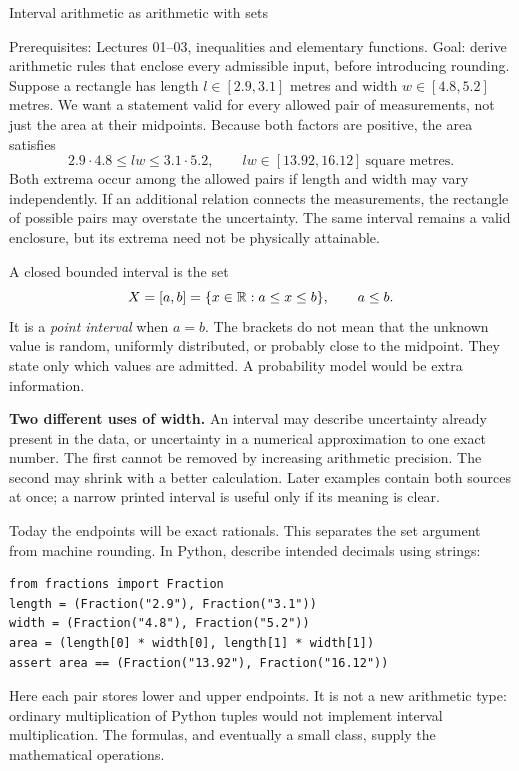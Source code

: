 \def\lecturenumber{04}


\opening{Interval arithmetic as arithmetic with sets}{Prerequisites: Lectures 01--03, inequalities and elementary functions.\newline
Goal: derive arithmetic rules that enclose every admissible input, before introducing rounding.}
Suppose a rectangle has length $l\in[2.9,3.1]$ metres and width
$w\in[4.8,5.2]$ metres. We want a statement valid for every allowed pair of
measurements, not just the area at their midpoints. Because both factors are
positive, the area satisfies
\[
 2.9\cdot4.8\le lw\le3.1\cdot5.2,
 \qquad lw\in[13.92,16.12]\ \text{square metres}.
\]
Both extrema occur among the allowed pairs if length and width may vary
independently. If an additional relation connects the measurements, the rectangle
of possible pairs may overstate the uncertainty. The same interval remains a
valid enclosure, but its extrema need not be physically attainable.

A closed bounded interval is the set
\[
 X=[a,b]=\{x\in\mathbb R:a\le x\le b\},\qquad a\le b.
\]
It is a \emph{point interval} when $a=b$. The brackets do not mean that the unknown
value is random, uniformly distributed, or probably close to the midpoint. They
state only which values are admitted. A probability model would be extra information.

\textbf{Two different uses of width.} An interval may describe uncertainty already
present in the data, or uncertainty in a numerical approximation to one exact
number. The first cannot be removed by increasing arithmetic precision. The
second may shrink with a better calculation. Later examples contain both sources
at once; a narrow printed interval is useful only if its meaning is clear.

Today the endpoints will be exact rationals. This separates the set argument from
machine rounding. In Python, describe intended decimals using strings:
\begin{lstlisting}
from fractions import Fraction
length = (Fraction("2.9"), Fraction("3.1"))
width = (Fraction("4.8"), Fraction("5.2"))
area = (length[0] * width[0], length[1] * width[1])
assert area == (Fraction("13.92"), Fraction("16.12"))
\end{lstlisting}
Here each pair stores lower and upper endpoints. It is not a new arithmetic type:
ordinary multiplication of Python tuples would not implement interval multiplication.
The formulas, and eventually a small class, supply the mathematical operations.

